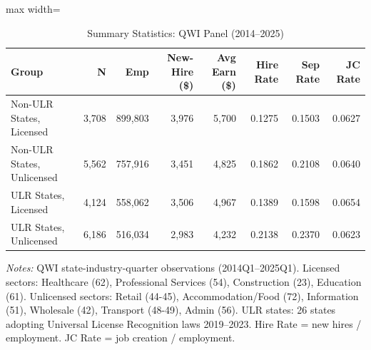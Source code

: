 \begin{table}[H]
\centering
\caption{Summary Statistics: QWI Panel (2014--2025)}
\label{tab:summary}
\begin{adjustbox}{max width=\textwidth}
\begin{tabular}{lrrrrrrr}
\toprule
Group & N & Emp & New-Hire (\$) & Avg Earn (\$) & Hire Rate & Sep Rate & JC Rate \\
\midrule
Non-ULR States, Licensed & 3,708 & 899,803 & 3,976 & 5,700 & 0.1275 & 0.1503 & 0.0627 \\
Non-ULR States, Unlicensed & 5,562 & 757,916 & 3,451 & 4,825 & 0.1862 & 0.2108 & 0.0640 \\
ULR States, Licensed & 4,124 & 558,062 & 3,506 & 4,967 & 0.1389 & 0.1598 & 0.0654 \\
ULR States, Unlicensed & 6,186 & 516,034 & 2,983 & 4,232 & 0.2138 & 0.2370 & 0.0623 \\
\bottomrule
\end{tabular}
\end{adjustbox}

\vspace{0.5em}
{\small \emph{Notes:} QWI state-industry-quarter observations (2014Q1--2025Q1). Licensed sectors: Healthcare (62), Professional Services (54), Construction (23), Education (61). Unlicensed sectors: Retail (44-45), Accommodation/Food (72), Information (51), Wholesale (42), Transport (48-49), Admin (56). ULR states: 26 states adopting Universal License Recognition laws 2019--2023. Hire Rate = new hires / employment. JC Rate = job creation / employment.}
\end{table}

